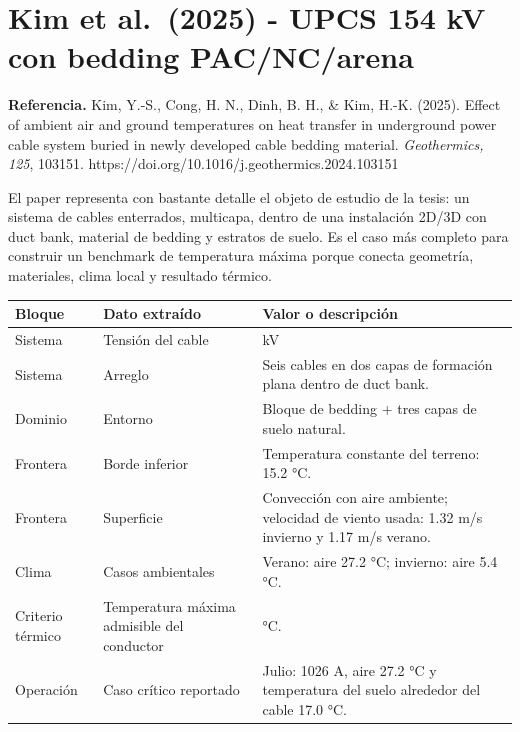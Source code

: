 \documentclass[11pt,a4paper,oneside]{report}
\begin{document}
\section{Kim et al.~(2025) - UPCS 154 kV con bedding
PAC/NC/arena}\label{kim-et-al.-2025---upcs-154-kv-con-bedding-pacncarena}

\textbf{Referencia.} Kim, Y.-S., Cong, H. N., Dinh, B. H., \& Kim, H.-K.
(2025). Effect of ambient air and ground temperatures on heat transfer
in underground power cable system buried in newly developed cable
bedding material. \emph{Geothermics, 125}, 103151.
https://doi.org/10.1016/j.geothermics.2024.103151

El paper representa con bastante detalle el objeto de estudio de la
tesis: un sistema de cables enterrados, multicapa, dentro de una
instalación 2D/3D con duct bank, material de bedding y estratos de
suelo. Es el caso más completo para construir un benchmark de
temperatura máxima porque conecta geometría, materiales, clima local y
resultado térmico.

\begin{longtable}[]{@{}
  >{\raggedright\arraybackslash}p{}
  >{\raggedright\arraybackslash}p{}
  >{\raggedright\arraybackslash}p{}@{}}
\toprule\noalign{}
\begin{minipage}[b]{\linewidth}\raggedright
Bloque
\end{minipage} & \begin{minipage}[b]{\linewidth}\raggedright
Dato extraído
\end{minipage} & \begin{minipage}[b]{\linewidth}\raggedright
Valor o descripción
\end{minipage} \\
\midrule\noalign{}
\endhead
\bottomrule\noalign{}
\endlastfoot
Sistema & Tensión del cable & 154 kV \\
Sistema & Arreglo & Seis cables en dos capas de formación plana dentro
de duct bank. \\
Dominio & Entorno & Bloque de bedding + tres capas de suelo natural. \\
Frontera & Borde inferior & Temperatura constante del terreno: 15.2
°C. \\
Frontera & Superficie & Convección con aire ambiente; velocidad de
viento usada: 1.32 m/s invierno y 1.17 m/s verano. \\
Clima & Casos ambientales & Verano: aire 27.2 °C; invierno: aire 5.4
°C. \\
Criterio térmico & Temperatura máxima admisible del conductor & 90
°C. \\
Operación & Caso crítico reportado & Julio: 1026 A, aire 27.2 °C y
temperatura del suelo alrededor del cable 17.0 °C. \\
\end{longtable}
\end{document}
